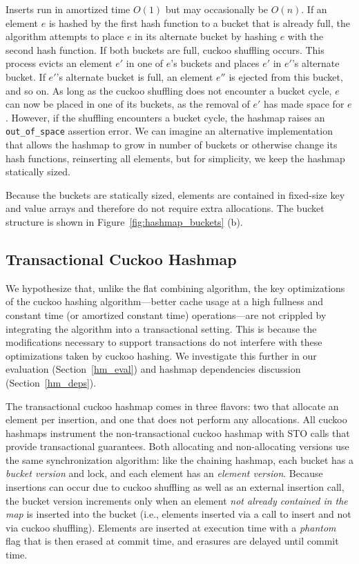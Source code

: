Inserts run in amortized time $O(1)$ but may occasionally be $O(n)$.
If an element $e$ is hashed by the first hash function to a bucket that is already full, the algorithm attempts to place $e$ in its alternate bucket by hashing $e$ with the second hash function. If both buckets are full, cuckoo shuffling occurs. This process evicts an element $e'$ in one of $e$'s buckets and places $e'$ in $e'$'s alternate bucket. If $e'$'s alternate bucket is full, an element $e''$ is ejected from this bucket, and so on. As long as the cuckoo shuffling does not encounter a bucket cycle, $e$ can now be placed in one of its buckets, as the removal of $e'$ has made space for $e$.
However, if the shuffling encounters a bucket cycle, the hashmap raises an \texttt{{out\_of\_space}} assertion error. We can imagine an alternative implementation that allows the hashmap to grow in number of buckets or otherwise change its hash functions, reinserting all elements, but for simplicity, we keep the hashmap statically sized.

Because the buckets are statically sized, elements are contained in fixed-size key and value arrays and therefore do not require extra allocations. The bucket structure is shown in Figure~\ref{fig:hashmap_buckets} (b). 

\subsection{Transactional Cuckoo Hashmap}

We hypothesize that, unlike the flat combining algorithm, the key optimizations of the cuckoo hashing algorithm---better cache usage at a high fullness and constant time (or amortized constant time) operations---are not crippled by integrating the algorithm into a transactional setting. This is because the modifications necessary to support transactions do not interfere with these optimizations taken by cuckoo hashing. We investigate this further in our evaluation (Section~\ref{hm_eval}) and hashmap dependencies discussion (Section~\ref{hm_deps}).

The transactional cuckoo hashmap comes in three flavors: two that allocate an element per insertion, and one that does not perform any allocations. All cuckoo hashmaps instrument the non-transactional cuckoo hashmap with STO calls that provide transactional guarantees.
Both allocating and non-allocating versions use the same synchronization algorithm: like the chaining hashmap, each bucket has a \emph{bucket version} and lock, and each element has an \emph{element version}. Because insertions can occur due to cuckoo shuffling as well as an external insertion call, the bucket version increments only when an element \emph{not already contained in the map} is inserted into the bucket (i.e., elements inserted via a call to insert and not via cuckoo shuffling). Elements are inserted at execution time with a \emph{phantom} flag that is then erased at commit time, and erasures are delayed until commit time.

